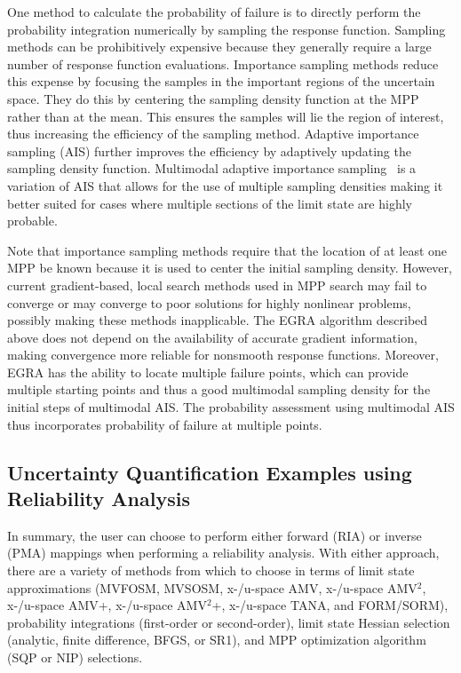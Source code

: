 One method to calculate the probability of failure is 
to directly perform the probability 
integration numerically by sampling the response function.
Sampling methods can be 
prohibitively expensive because they generally require a large 
number of response function evaluations.
Importance sampling methods reduce this expense by focusing the samples in 
the important regions of the uncertain space.
They do this by centering the sampling density function at the MPP rather
than at the mean.
This ensures the samples will lie the region of interest, 
thus increasing the efficiency of the sampling method.
Adaptive importance sampling (AIS) further improves the efficiency by 
adaptively updating the sampling density function.
Multimodal adaptive importance sampling~\cite{Dey98} is a 
variation of AIS that allows for the use of multiple sampling densities 
making it better suited for cases where multiple sections of the limit state 
are highly probable.

Note that importance sampling methods require that the location of at least 
one MPP be known because it is used to center the initial sampling density.
However, current gradient-based, local search methods used in MPP search may 
fail to converge or may converge to poor solutions for 
highly nonlinear problems, possibly making these methods inapplicable.
The EGRA algorithm described above does 
not depend on the availability of accurate gradient information, making
convergence more reliable for nonsmooth response functions.
Moreover, EGRA has the ability to locate multiple failure points, which 
can provide multiple starting points and thus a good multimodal sampling density for the initial steps of multimodal AIS. The probability assessment 
using multimodal AIS thus incorporates probability of failure at 
multiple points.

\subsection{Uncertainty Quantification Examples using Reliability Analysis} \label{uq:reliability:ex}


In summary, the user can choose to perform either forward (RIA) or
inverse (PMA) mappings when performing a reliability analysis. With
either approach, there are a variety of methods from which to choose
in terms of limit state approximations (MVFOSM, MVSOSM, x-/u-space
AMV, x-/u-space AMV$^2$, x-/u-space AMV+, x-/u-space AMV$^2$+,
x-/u-space TANA, and FORM/SORM), probability integrations
(first-order or second-order), limit state Hessian selection
(analytic, finite difference, BFGS, or SR1), and MPP optimization
algorithm (SQP or NIP) selections.

